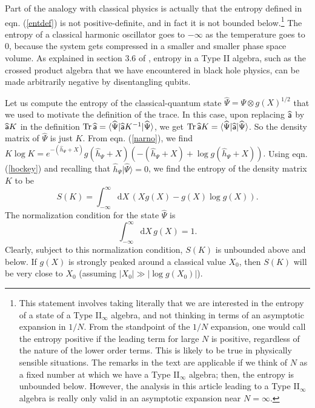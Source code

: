 \documentclass[11pt,a4paper]{article}
\def\a{{\sf a}}
\def\be{\begin{equation}}
\def\ee{\end{equation}}
\def\h{\widehat}
\def\d{{\mathrm d}}
\def\h{\widehat}
\def\la{\langle}
\def\ra{\rangle}
\def\Tr{\mathrm{Tr}}
\begin{document}
Part of the analogy with classical physics is actually that the entropy defined in eqn. (\ref{entdef}) is not positive-definite, and in fact it is not bounded below.\footnote{This
statement involves taking literally that we are interested in the entropy of a state of a Type II$_\infty$ algebra, and not thinking in terms of an asymptotic expansion in
$1/N$.  From the standpoint of the $1/N$ expansion, one would call the entropy positive if the leading term for large $N$ is positive, regardless of the
nature of the lower order terms.   This is likely to be true in physically sensible situations.   The remarks in the text are applicable if we think of $N$ as a fixed number at which we have
a Type II$_\infty$ algebra; then, the entropy is unbounded below.  However, the analysis in this article leading to a Type II$_\infty$ algebra is really only
valid in an asymptotic expansion near $N=\infty$.}  
  The entropy of a classical harmonic oscillator
goes to $-\infty$ as the temperature goes to 0, because the system gets compressed in a smaller and smaller phase space volume.  As explained in section 3.6
of \cite{Lecture}, entropy in a Type II algebra, such as the crossed product algebra that we have encountered in black hole physics,
 can be made arbitrarily negative by disentangling qubits.  


Let us compute the entropy of the classical-quantum state 
$\h\Psi =\Psi\otimes g(X)^{1/2}$ that we used to motivate the definition of the trace.   In this case, upon replacing $\h\a$ by $\h\a K$ in the definition 
$\Tr\,\h\a=\la\h\Psi|\h\a K^{-1}|\h\Psi\ra$, we get $\Tr\,\h\a K=\la\h\Psi|\h\a|\h\Psi\ra$.   So the density matrix of $\h\Psi$ is just $K$. 
From eqn. (\ref{narno}), we find  $K\log K=e^{-(\h h_\Psi+X)}g(\h h_\Psi+X)(-(\h h_\Psi+X)+\log g(\h h_\Psi +X)).$  Using eqn. (\ref{hockey}) and recalling that $\h h_\Psi|\h\Psi\ra=0$, we find
the entropy of the density matrix $K$ to be
\be\label{tungolo} S(K)=\int_{-\infty}^\infty \d X \,\left(X g(X)-g(X) \log g(X)\right). \ee
The normalization condition for the state $\h\Psi$  is
\be\label{bongo}\int_{-\infty}^\infty\d X\, g(X)=1. \ee
Clearly, subject to this normalization condition, $S(K)$ is  unbounded above and below.   If $g(X)$ is strongly peaked around a classical value $X_0$,
then $S(K)$ will be very close to $X_0$ (assuming $|X_0|\gg |\log g(X_0)|$).   
\end{document}
